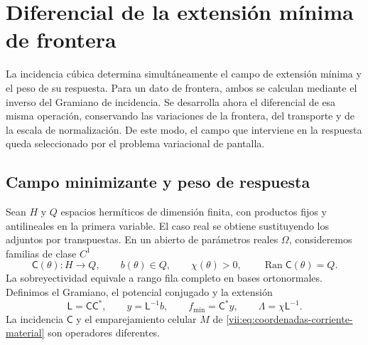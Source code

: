 
\section{Diferencial de la extensión mínima de frontera}
\label{vii:sec:corriente-extension-minima}

La incidencia cúbica determina simultáneamente el campo de extensión
mínima y el peso de su respuesta. Para un dato de frontera, ambos se
calculan mediante el inverso del Gramiano de incidencia. Se desarrolla
ahora el diferencial de esa misma operación, conservando las variaciones
de la frontera, del transporte y de la escala de normalización. De este
modo, el campo que interviene en la respuesta queda seleccionado por
el problema variacional de pantalla.

\subsection{Campo minimizante y peso de respuesta}
\label{vii:subsec:extension-minima-parametrizada}

Sean \(H\) y \(Q\) espacios hermíticos de dimensión finita, con
productos fijos y antilineales en la primera variable. El caso real se
obtiene sustituyendo los adjuntos por transpuestas. En un abierto de
parámetros reales \(\Omega\), consideremos familias de clase \(C^1\)
\[
 \mathsf C(\theta):H\longrightarrow Q,\qquad
 b(\theta)\in Q,\qquad \chi(\theta)>0,
 \qquad \operatorname{Ran}\mathsf C(\theta)=Q.
\]
La sobreyectividad equivale a rango fila completo en bases ortonormales.
Definimos el Gramiano, el potencial conjugado y la extensión
\begin{equation}
 \mathsf L=\mathsf C\mathsf C^*,\qquad
 y=\mathsf L^{-1}b,\qquad f_{\min}=\mathsf C^*y,
 \qquad \Lambda=\chi\mathsf L^{-1}.
 \label{vii:eq:gramiano-extension-minima}
\end{equation}
La incidencia \(\mathsf C\) y el emparejamiento celular \(M\) de
\eqref{vii:eq:coordenadas-corriente-material} son operadores diferentes.


